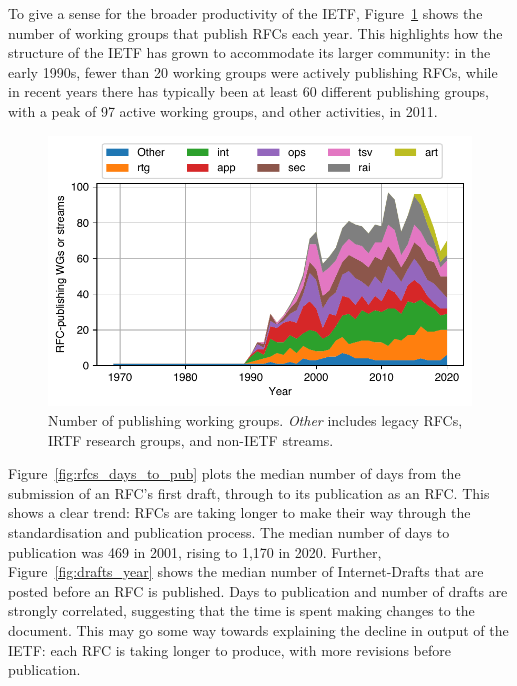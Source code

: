 \documentclass[twocolumn,10pt]{article}
\newlength{\figureWidthOneColumn}
\begin{document}
To give a sense for the broader productivity of the IETF,
Figure~\ref{fig:pub_wgs_yearly} shows the number of working groups that
publish RFCs each year. This highlights how the structure of the IETF has
grown to accommodate its larger community: in the early 1990s, fewer than
20 working groups were actively publishing RFCs, while in recent years
there has typically been at least 60 different publishing groups, with a
peak of 97 active working groups, and other activities, in 2011.

\begin{figure}
  \centering
  \includegraphics[width=\figureWidthOneColumn]{figures-prev/imc-2021/documents/unique_wgs_per_year_areas.pdf}
  \caption{
    Number of publishing working groups. \textit{Other} includes legacy
    RFCs, IRTF research groups, and non-IETF streams.
  }
  \label{fig:pub_wgs_yearly}
\end{figure}

Figure~\ref{fig:rfcs_days_to_pub} plots the median number of days from the
submission of an RFC's first draft, through to its publication as an RFC.
This shows a clear trend: RFCs are taking longer to make their way through
the standardisation and publication process. The median number of days to
publication was 469 in 2001, rising to 1,170 in 2020. Further,
Figure~\ref{fig:drafts_year} shows the median number of Internet-Drafts
that are posted before an RFC is published. Days to publication and number
of drafts are strongly correlated, suggesting that the time is spent making
changes to the document. This may go some way towards explaining the
decline in output of the IETF: each RFC is taking longer to produce, with
more revisions before publication. 
\end{document}
